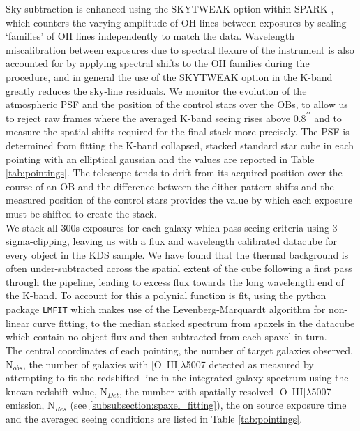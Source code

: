 \documentclass[fleqn,usenatbib]{mn2e}
\begin{document}
Sky subtraction is enhanced using the SKYTWEAK option within SPARK \citep{Davies2007}, which counters the varying amplitude of OH lines between exposures by scaling `families' of OH lines independently to match the data.
Wavelength miscalibration between exposures due to spectral flexure of the instrument is also accounted for by applying spectral shifts to the OH families during the procedure, and in general the use of the SKYTWEAK option in the K-band greatly reduces the sky-line residuals. 
We monitor the evolution of the atmospheric PSF and the position of the control stars over the OBs, to allow us to reject raw frames where the averaged K-band seeing rises above $0.8^{\prime\prime}$ and to measure the spatial shifts required for the final stack more precisely.
The PSF is determined from fitting the K-band collapsed, stacked standard star cube in each pointing with an elliptical gaussian and the values are reported in Table \ref{tab:pointings}.
The telescope tends to drift from its acquired position over the course of an OB and the difference between the dither pattern shifts and the measured position of the control stars provides the value by which each exposure must be shifted to create the stack. \\

We stack all 300s exposures for each galaxy which pass seeing criteria using 3 sigma-clipping, leaving us with a flux and wavelength calibrated datacube for every object in the KDS sample.
We have found that the thermal background is often under-subtracted across the spatial extent of the cube following a first pass through the pipeline, leading to excess flux towards the long wavelength end of the K-band.
To account for this a polynial function is fit, using the python package {\tt LMFIT} \citep{Newville2014} which makes use of the Levenberg-Marquardt algorithm for non-linear curve fitting, to the median stacked spectrum from spaxels in the datacube which contain no object flux and then subtracted from each spaxel in turn. \\

The central coordinates of each pointing, the number of target galaxies observed, N$_{obs}$, the number of galaxies with [O~{\sc III}]$\lambda$5007 detected as measured by attempting to fit the redshifted line in the integrated galaxy spectrum using the known redshift value, N$_{Det}$, the number with spatially resolved [O~{\sc III}]$\lambda$5007 emission, N$_{Res}$ (see \cref{subsubsection:spaxel_fitting}), the on source exposure time and the averaged seeing conditions are listed in Table \ref{tab:pointings}.
\end{document}
